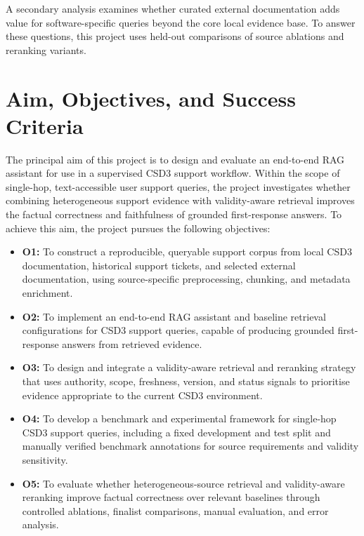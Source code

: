 A secondary analysis examines whether curated external documentation adds value for software-specific queries beyond the core local evidence base. To answer these questions, this project uses held-out comparisons of source ablations and reranking variants. 

\section{Aim, Objectives, and Success Criteria}
\label{sec:aim}

The principal aim of this project is to design and evaluate an end-to-end \ac{RAG} assistant for use in a supervised \ac{CSD3} support workflow. Within the scope of single-hop, text-accessible user support queries, the project investigates whether combining heterogeneous support evidence with validity-aware retrieval improves the factual correctness and faithfulness of grounded first-response answers. To achieve this aim, the project pursues the following objectives:

\begin{itemize}
    \item \textbf{O1:} To construct a reproducible, queryable support corpus from local \ac{CSD3} documentation, historical support tickets, and selected external documentation, using source-specific preprocessing, chunking, and metadata enrichment. 
    \item \textbf{O2:} To implement an end-to-end \ac{RAG} assistant and baseline retrieval configurations for \ac{CSD3} support queries, capable of producing grounded first-response answers from retrieved evidence. 
    \item \textbf{O3:} To design and integrate a validity-aware retrieval and reranking strategy that uses authority, scope, freshness, version, and status signals to prioritise evidence appropriate to the current \ac{CSD3} environment. 
    \item \textbf{O4:} To develop a benchmark and experimental framework for single-hop \ac{CSD3} support queries, including a fixed development and test split and manually verified benchmark annotations for source requirements and validity sensitivity. 
    \item \textbf{O5:} To evaluate whether heterogeneous-source retrieval and validity-aware reranking improve factual correctness over relevant baselines through controlled ablations, finalist comparisons, manual evaluation, and error analysis. 
\end{itemize}

